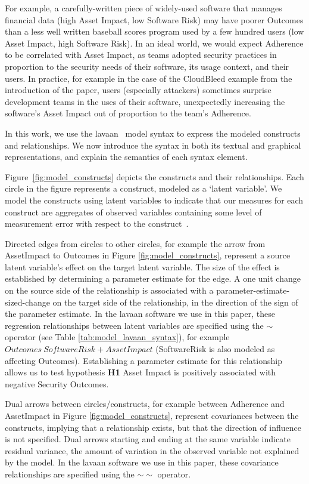 For example, a carefully-written piece of widely-used software that manages financial data (high Asset Impact, low Software Risk) may have poorer Outcomes than a less well written baseball scores program used by a few hundred users (low Asset Impact, high Software Risk). In an ideal world, we would expect Adherence to be correlated with Asset Impact, as teams adopted security practices in proportion to the security needs of their software, its usage context, and their users. In practice, for example in the case of the CloudBleed example from the introduction of the paper, users (especially attackers) sometimes surprise development teams in the uses of their software, unexpectedly increasing the software's Asset Impact out of proportion to the team's Adherence. 

In this work, we use the lavaan~\cite{roseel2012lavaan} model syntax to express the modeled constructs and relationships.  We now introduce the syntax in both its textual and graphical representations, and explain the semantics of each syntax element.

Figure~\ref{fig:model_constructs} depicts the constructs and their relationships.  Each circle in the figure represents a construct, modeled as a `latent variable'. We model the constructs using latent variables to indicate that our measures for each construct are aggregates of observed variables containing some level of measurement error with respect to the construct~\cite{kline2015principles,borsboom2008latent}. 

Directed edges from circles to other circles, for example the arrow from AssetImpact to Outcomes in Figure \ref{fig:model_constructs}, represent a source latent variable's effect on the target latent variable. The size of the effect is established by determining a parameter estimate for the edge. A one unit change on the source side of the relationship is associated with a parameter-estimate-sized-change on the target side of the relationship, in the direction of the sign of the parameter estimate. In the lavaan software we use in this paper, these regression relationships between latent variables are specified using the $\sim$  operator (see Table \ref{tab:model_lavaan_syntax}), for example $Outcomes ~ SoftwareRisk + AssetImpact$ (SoftwareRisk is also modeled as affecting Outcomes).   Establishing a parameter estimate for this relationship allows us to test hypothesis \textbf{H1} Asset Impact is positively associated with negative Security Outcomes.

Dual arrows between circles/constructs, for example between Adherence and AssetImpact in Figure \ref{fig:model_constructs}, represent covariances between the constructs, implying that a relationship exists, but that the direction of influence is not specified. Dual arrows starting and ending at the same variable indicate residual variance, the amount of variation in the observed variable not explained by the model. In the lavaan software we use in this paper, these covariance relationships are specified using the $\sim\sim$ operator.

